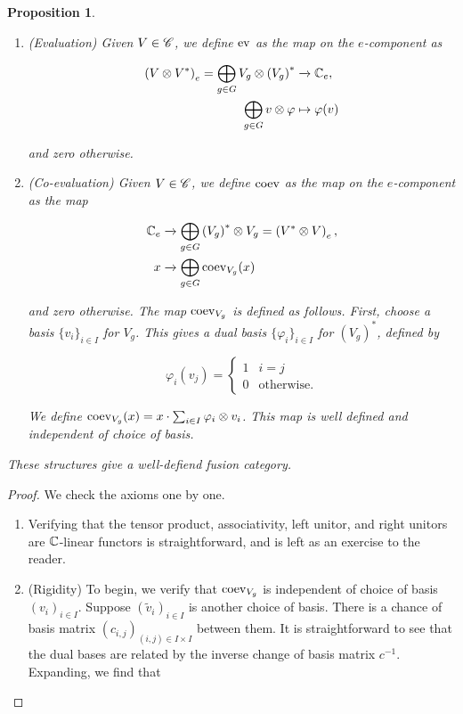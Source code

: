 \documentclass{article}
\newtheorem{proposition}{Proposition}[section]
\theoremstyle{definition}
\numberwithin{figure}{section}
\begin{document}
\begin{enumerate}[\thesection .1.]
\begin{proposition}
\begin{enumerate}
$$\left(V^*\right)_g= \left(V_{g^{-1}}\right)^*.$$

\item (Evaluation) Given $V\in \mathscr{C}$, we define $\mathrm{ev}$ as the map on the $e$-component as

\begin{align*}
\left(V\otimes V^*\right)_e=\bigoplus_{g\in G}V_g\otimes \left(V_g\right)^*&\xrightarrow{} \mathbb{C}_e,\\
\bigoplus_{g\in G}v\otimes \varphi & \mapsto \varphi(v)
\end{align*}

and zero otherwise.

\item (Co-evaluation) Given $V\in \mathscr{C}$, we define $\mathrm{coev}$ as the map on the $e$-component as the map

\begin{align*}
\mathbb{C}_e&\xrightarrow{}\bigoplus_{g\in G}\left(V_g\right)^*\otimes V_g=\left(V^*\otimes V\right)_e,\\
x&\xrightarrow{} \bigoplus_{g\in G}\mathrm{coev}_{V_g}(x)
\end{align*}

and zero otherwise. The map $\mathrm{coev}_{V_g}$ is defined as follows. First, choose a basis $\{v_i\}_{i\in I}$ for $V_g$. This gives a dual basis $\{\varphi_i\}_{i\in I}$ for $\left(V_g\right)^*$, defined by

$$\varphi_i(v_j)=
\begin{cases}
1 & i=j\\
0 & \text{otherwise.}
\end{cases}$$

We define $\mathrm{coev}_{V_g}(x)=x\cdot \sum_{i\in I}\varphi_i\otimes v_i$. This map is well defined and independent of choice of basis.
\end{enumerate}

These structures give a well-defiend fusion category.
\end{proposition}
\begin{proof} We check the axioms one by one.

\begin{enumerate}
\item Verifying that the tensor product, associativity, left unitor, and right unitors are $\mathbb{C}$-linear functors is straightforward, and is left as an exercise to the reader.

\item (Rigidity) To begin, we verify that $\mathrm{coev}_{V_g}$ is independent of choice of basis $\left(v_i\right)_{i\in I}$. Suppose $\left(\tilde{v}_i\right)_{i\in I}$ is another choice of basis. There is a chance of basis matrix $(c_{i,j})_{(i,j)\in I\times I}$ between them. It is straightforward to see that the dual bases are related by the inverse change of basis matrix $c^{-1}$. Expanding, we find that


\end{enumerate}
\end{proof}
\end{enumerate}
\end{document}
